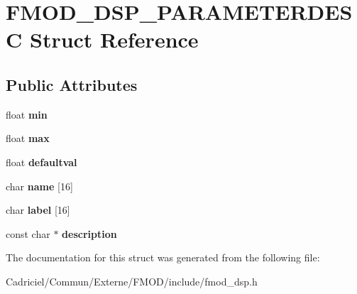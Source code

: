 \hypertarget{struct_f_m_o_d___d_s_p___p_a_r_a_m_e_t_e_r_d_e_s_c}{}\section{F\+M\+O\+D\+\_\+\+D\+S\+P\+\_\+\+P\+A\+R\+A\+M\+E\+T\+E\+R\+D\+E\+SC Struct Reference}
\label{struct_f_m_o_d___d_s_p___p_a_r_a_m_e_t_e_r_d_e_s_c}
\subsection*{Public Attributes}
\begin{DoxyCompactItemize}
\item 
float {\bfseries min}\hypertarget{struct_f_m_o_d___d_s_p___p_a_r_a_m_e_t_e_r_d_e_s_c_a6a70d0988ed0a13192f2d2beb2bd5595}{}\label{struct_f_m_o_d___d_s_p___p_a_r_a_m_e_t_e_r_d_e_s_c_a6a70d0988ed0a13192f2d2beb2bd5595}

\item 
float {\bfseries max}\hypertarget{struct_f_m_o_d___d_s_p___p_a_r_a_m_e_t_e_r_d_e_s_c_aabb0d4e04d947e9830378115e3085402}{}\label{struct_f_m_o_d___d_s_p___p_a_r_a_m_e_t_e_r_d_e_s_c_aabb0d4e04d947e9830378115e3085402}

\item 
float {\bfseries defaultval}\hypertarget{struct_f_m_o_d___d_s_p___p_a_r_a_m_e_t_e_r_d_e_s_c_a9f47edb0a65cceaa81dd3cc77a272734}{}\label{struct_f_m_o_d___d_s_p___p_a_r_a_m_e_t_e_r_d_e_s_c_a9f47edb0a65cceaa81dd3cc77a272734}

\item 
char {\bfseries name} \mbox{[}16\mbox{]}\hypertarget{struct_f_m_o_d___d_s_p___p_a_r_a_m_e_t_e_r_d_e_s_c_a1619c32ff0267079429a9fa4c76f5745}{}\label{struct_f_m_o_d___d_s_p___p_a_r_a_m_e_t_e_r_d_e_s_c_a1619c32ff0267079429a9fa4c76f5745}

\item 
char {\bfseries label} \mbox{[}16\mbox{]}\hypertarget{struct_f_m_o_d___d_s_p___p_a_r_a_m_e_t_e_r_d_e_s_c_a989bbcd725bbe64d8ec330be19037d78}{}\label{struct_f_m_o_d___d_s_p___p_a_r_a_m_e_t_e_r_d_e_s_c_a989bbcd725bbe64d8ec330be19037d78}

\item 
const char $\ast$ {\bfseries description}\hypertarget{struct_f_m_o_d___d_s_p___p_a_r_a_m_e_t_e_r_d_e_s_c_aff99d44f94a9bcded22e7a24a8976f41}{}\label{struct_f_m_o_d___d_s_p___p_a_r_a_m_e_t_e_r_d_e_s_c_aff99d44f94a9bcded22e7a24a8976f41}

\end{DoxyCompactItemize}


The documentation for this struct was generated from the following file\+:\begin{DoxyCompactItemize}
\item 
Cadriciel/\+Commun/\+Externe/\+F\+M\+O\+D/include/fmod\+\_\+dsp.\+h\end{DoxyCompactItemize}
